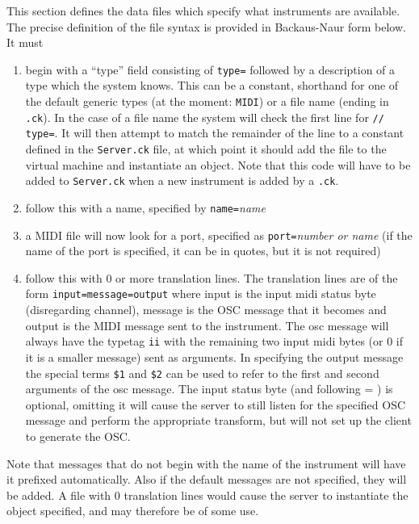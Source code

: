 \documentclass[12pt]{article}
\begin{document}
This section defines the data files which specify what instruments are available. The precise definition of the file syntax is provided in 
Backaus-Naur form below. 
It must 
\begin{enumerate} [\bfseries a)]
\item{begin with a ``type'' field consisting of \texttt{type=} followed by a description of a type which the system knows. This can be
a constant, shorthand for one of the default generic types (at the moment: \texttt{MIDI}) or a file name (ending in \texttt{.ck}). In the case of a file name
the system will check the first line for \texttt{// type=}. It will then attempt to match the remainder of the line to a constant defined in the \texttt{Server.ck}
file, at which point it should add the file to the virtual machine and instantiate an object. Note that this code will have to be added to \texttt{Server.ck}
when a new instrument is added by a \texttt{.ck}.}
\item{follow this with a name, specified by \texttt{name=}\textit{name}}
\item{a MIDI file will now look for a port, specified as \texttt{port=}\textit{number or name}} (if the name of the port is specified, it can be in quotes,
 but it is not required)
\item{follow this with 0 or more translation lines. The translation lines are of the form \texttt{input=message=output} where input is the input midi
	 status byte (disregarding channel), message is the OSC message that it becomes and output is the MIDI message sent to the instrument.
	 The osc message will always have the typetag \texttt{ii} with the remaining two input midi bytes (or 0 if it is a smaller message) sent as 
	 arguments. In specifying the output message the special terms \texttt{\$1} and \texttt{\$2} can be used to refer to the first and second arguments
	 of the osc message. The input status byte (and following = ) is optional, omitting it will cause the server to still listen for the specified OSC
	 message and perform the appropriate transform, but will not set up the client to generate the OSC.}

\end{enumerate}

Note that messages that do not begin with the name of the instrument will have it prefixed automatically. Also if the default messages are not specified, 
they will be added.
A file with 0 translation lines would cause the server to instantiate the object specified, and may therefore be of some use.
\end{document}
